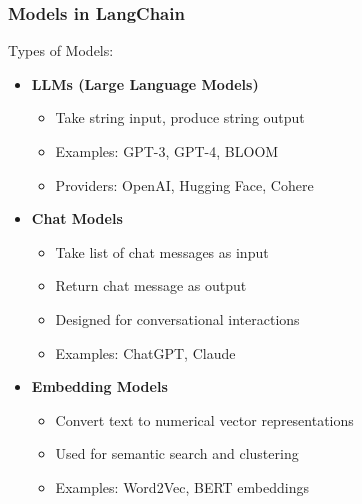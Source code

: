 \begin{frame}\frametitle{Models in LangChain}

Types of Models:
\begin{itemize}
\item \textbf{LLMs (Large Language Models)}
    \begin{itemize}
    \item Take string input, produce string output
    \item Examples: GPT-3, GPT-4, BLOOM
    \item Providers: OpenAI, Hugging Face, Cohere
    \end{itemize}

\item \textbf{Chat Models}
    \begin{itemize}
    \item Take list of chat messages as input
    \item Return chat message as output
    \item Designed for conversational interactions
    \item Examples: ChatGPT, Claude
    \end{itemize}

\item \textbf{Embedding Models}
    \begin{itemize}
    \item Convert text to numerical vector representations
    \item Used for semantic search and clustering
    \item Examples: Word2Vec, BERT embeddings
    \end{itemize}
\end{itemize}

\end{frame}

